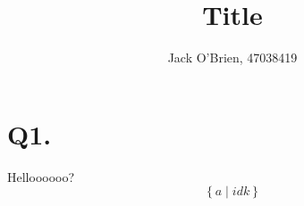 \documentclass[12pt]{article}
\title{Title}
\author{Jack O'Brien, 47038419}
\date{}
\newcommand{\set}[1]{\left\{ #1 \right\}}
\newcommand{\set}[1]{\left\{ #1 \right\}}
\begin{document}
\maketitle

\section*{Q1. }
Helloooooo?
$$\set{a \mid idk}$$
\end{document}
